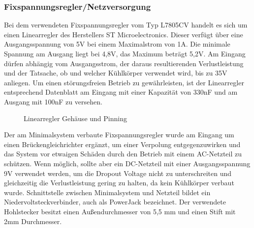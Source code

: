 \subsubsection{Fixspannungsregler/Netzversorgung}
Bei dem verwendeten Fixspannungsregler vom Typ L7805CV handelt es sich um einen Linearregler des Herstellers ST Microelectronics. Dieser verfügt über eine Ausgangsspannung von 5V bei einem Maximalstrom von 1A. Die minimale Spannung am Ausgang liegt bei 4,8V, das Maximum beträgt 5,2V. Am Eingang dürfen abhängig vom Ausgangsstrom, der daraus resultierenden Verlustleistung und der Tatsache, ob und welcher Kühlkörper verwendet wird, bis zu 35V anliegen. Um einen störungsfreien Betrieb zu gewährleisten, ist der Linearregler entsprechend Datenblatt am Eingang mit einer Kapazität von 330nF und am Ausgang mit 100nF zu versehen.
\begin{figure}[htb]
    \qquad
    \qquad
    \caption[Z80 Linearregler Gehäuse und Pinning]{Linearregler Gehäuse und Pinning \cite{z80:lin}}
    \label{fig:z80-lin-1}
\end{figure}
Der am Minimalsystem verbaute Fixspannungsregler wurde am Eingang um einen Brückengleichrichter ergänzt, um einer Verpolung entgegenzuwirken und das System vor etwaigen Schäden durch den Betrieb mit einem AC-Netzteil zu schützen. Wenn möglich, sollte aber ein DC-Netzteil mit einer Ausgangsspannung 9V verwendet werden, um die Dropout Voltage nicht zu unterschreiten und gleichzeitig die Verlustleistung gering zu halten, da kein Kühlkörper verbaut wurde. Schnittstelle zwischen Minimalsystem und Netzteil bildet ein Niedervoltsteckverbinder, auch als PowerJack bezeichnet. Der verwendete Hohlstecker besitzt einen Außendurchmesser von 5,5 mm und einen Stift mit 2mm Durchmesser.

